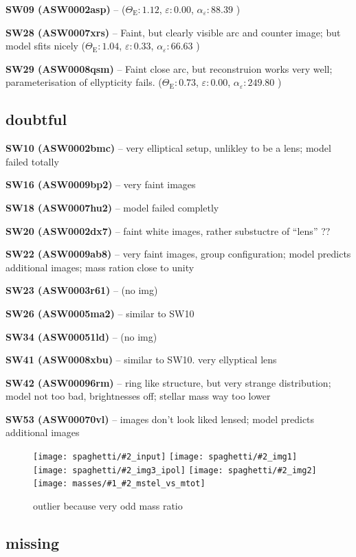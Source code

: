 \documentclass[fleqn,usenatbib]{mnras}
\newcommand{\inclfig}[2]{
  \centering
	\texttt{[image: spaghetti/\#2\_input]}%
	\texttt{[image: spaghetti/\#2\_img1]}
	\texttt{[image: spaghetti/\#2\_img3\_ipol]}%
	\texttt{[image: spaghetti/\#2\_img2]}
	\texttt{[image: masses/\#1\_\#2\_mstel\_vs\_mtot]}
}
\newcommand{\lenstitle}[1]{\noindent\textbf{#1} --}
\newcommand{\params}[3]{(\(\Theta_\text{E}:#1\), $\varepsilon:#2$, $\alpha_\varepsilon:#3$ )}
\begin{document}
\lenstitle{SW09 (ASW0002asp)}
\params{1.12}{0.00}{88.39}
  
\lenstitle{SW28 (ASW0007xrs)}
Faint, but clearly visible arc and counter image;
but model sfits nicely
\params{1.04}{0.33}{66.63}
 
\lenstitle{SW29 (ASW0008qsm)}
Faint close arc, but reconstruion works very well;
parameterisation of ellypticity fails.
\params{0.73}{0.00}{249.80}


\subsection{doubtful}

\lenstitle{SW10 (ASW0002bmc)} 
  very elliptical setup, unlikley to be a lens;
  model failed totally
  
\lenstitle{SW16 (ASW0009bp2)} 
  very faint images
  
\lenstitle{SW18 (ASW0007hu2)} 
  model failed completly
  
\lenstitle{SW20 (ASW0002dx7)} 
  faint white images, rather substuctre of ``lens'' ??
  
\lenstitle{SW22 (ASW0009ab8)} 
  very faint images, group configuration;
  model predicts additional images;
  mass ration close to unity
  
\lenstitle{SW23 (ASW0003r61)} 
  (no img)
  
\lenstitle{SW26 (ASW0005ma2)} 
  similar to SW10
  
\lenstitle{SW34 (ASW00051ld)} 
  (no img)
  
\lenstitle{SW41 (ASW0008xbu)} 
  similar to SW10. very ellyptical lens
  
\lenstitle{SW42 (ASW00096rm)} 
  ring like structure, but very strange distribution;
  model not too bad, brightnesses off;
  stellar mass way too lower
  
\lenstitle{SW53 (ASW00070vl)} 
  images don't look liked lensed;
  model predicts additional images
  



\begin{figure}
  \inclfig{SW42}{ASW00096rm_4Q3YCEWGLN}
  \caption{outlier because very odd mass ratio}
  \label{fig:SW42}
\end{figure}







\subsection{missing}
\end{document}
